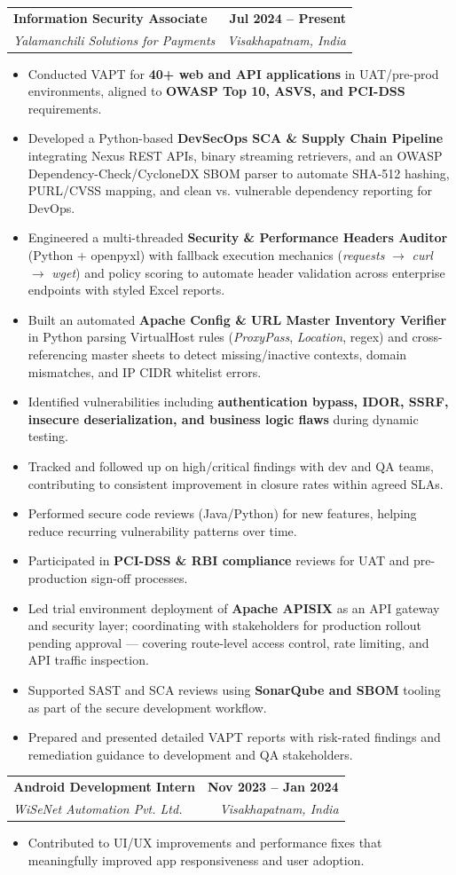 \documentclass[letterpaper,10pt]{article}
\makeatletter
\newcommand{\ResumeHeading}[4]{%
  \vspace{2pt}\noindent
  \begin{tabular*}{\textwidth}{@{\extracolsep{\fill}}p{0.72\textwidth} r}
    \textbf{#1} & \textbf{#2} \\
    \textit{#3} & \textit{\small #4} \\
  \end{tabular*}\vspace{3pt}
}
\newcommand{\resItem}[1]{\item \small #1}
\makeatother
\begin{document}
\ResumeHeading{Information Security Associate}{Jul 2024 -- Present}{Yalamanchili Solutions for Payments}{Visakhapatnam, India}
\begin{itemize}
  \resItem{Conducted VAPT for \textbf{40+ web and API applications} in UAT/pre-prod environments, aligned to \textbf{OWASP Top 10, ASVS, and PCI-DSS} requirements.}
  \resItem{Developed a Python-based \textbf{DevSecOps SCA \& Supply Chain Pipeline} integrating Nexus REST APIs, binary streaming retrievers, and an OWASP Dependency-Check/CycloneDX SBOM parser to automate SHA-512 hashing, PURL/CVSS mapping, and clean vs. vulnerable dependency reporting for DevOps.}
  \resItem{Engineered a multi-threaded \textbf{Security \& Performance Headers Auditor} (Python + openpyxl) with fallback execution mechanics (\textit{requests} $\rightarrow$ \textit{curl} $\rightarrow$ \textit{wget}) and policy scoring to automate header validation across enterprise endpoints with styled Excel reports.}
  \resItem{Built an automated \textbf{Apache Config \& URL Master Inventory Verifier} in Python parsing VirtualHost rules (\textit{ProxyPass}, \textit{Location}, regex) and cross-referencing master sheets to detect missing/inactive contexts, domain mismatches, and IP CIDR whitelist errors.}
  \resItem{Identified vulnerabilities including \textbf{authentication bypass, IDOR, SSRF, insecure deserialization, and business logic flaws} during dynamic testing.}
  \resItem{Tracked and followed up on high/critical findings with dev and QA teams, contributing to consistent improvement in closure rates within agreed SLAs.}
  \resItem{Performed secure code reviews (Java/Python) for new features, helping reduce recurring vulnerability patterns over time.}
  \resItem{Participated in \textbf{PCI-DSS \& RBI compliance} reviews for UAT and pre-production sign-off processes.}
  \resItem{Led trial environment deployment of \textbf{Apache APISIX} as an API gateway and security layer; coordinating with stakeholders for production rollout pending approval --- covering route-level access control, rate limiting, and API traffic inspection.}
  \resItem{Supported SAST and SCA reviews using \textbf{SonarQube and SBOM} tooling as part of the secure development workflow.}
  \resItem{Prepared and presented detailed VAPT reports with risk-rated findings and remediation guidance to development and QA stakeholders.}
\end{itemize}

\ResumeHeading{Android Development Intern}{Nov 2023 -- Jan 2024}{WiSeNet Automation Pvt. Ltd.}{Visakhapatnam, India}
\begin{itemize}
  \resItem{Contributed to UI/UX improvements and performance fixes that meaningfully improved app responsiveness and user adoption.}
\end{itemize}
\end{document}
